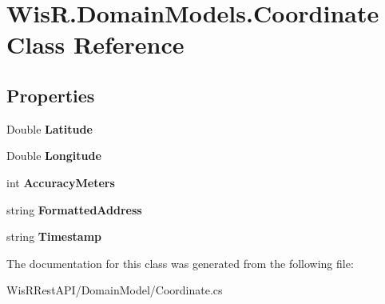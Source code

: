 \hypertarget{class_wis_r_1_1_domain_models_1_1_coordinate}{}\section{Wis\+R.\+Domain\+Models.\+Coordinate Class Reference}
\label{class_wis_r_1_1_domain_models_1_1_coordinate}
\subsection*{Properties}
\begin{DoxyCompactItemize}
\item 
\hypertarget{class_wis_r_1_1_domain_models_1_1_coordinate_a87c67d942811438a8b74180c3bc58ac2}{}Double {\bfseries Latitude}\label{class_wis_r_1_1_domain_models_1_1_coordinate_a87c67d942811438a8b74180c3bc58ac2}

\item 
\hypertarget{class_wis_r_1_1_domain_models_1_1_coordinate_afcd53a0b3bf6bf99286ad20c35f309cb}{}Double {\bfseries Longitude}\label{class_wis_r_1_1_domain_models_1_1_coordinate_afcd53a0b3bf6bf99286ad20c35f309cb}

\item 
\hypertarget{class_wis_r_1_1_domain_models_1_1_coordinate_a2f4a30d5084b3d7b00fa4f613e932066}{}int {\bfseries Accuracy\+Meters}\label{class_wis_r_1_1_domain_models_1_1_coordinate_a2f4a30d5084b3d7b00fa4f613e932066}

\item 
\hypertarget{class_wis_r_1_1_domain_models_1_1_coordinate_ab25e4f41fe6bc5eda91552358ef94419}{}string {\bfseries Formatted\+Address}\label{class_wis_r_1_1_domain_models_1_1_coordinate_ab25e4f41fe6bc5eda91552358ef94419}

\item 
\hypertarget{class_wis_r_1_1_domain_models_1_1_coordinate_ab00de276aef7df4921a57e00ff0d5991}{}string {\bfseries Timestamp}\label{class_wis_r_1_1_domain_models_1_1_coordinate_ab00de276aef7df4921a57e00ff0d5991}

\end{DoxyCompactItemize}


The documentation for this class was generated from the following file\+:\begin{DoxyCompactItemize}
\item 
Wis\+R\+Rest\+A\+P\+I/\+Domain\+Model/Coordinate.\+cs\end{DoxyCompactItemize}
